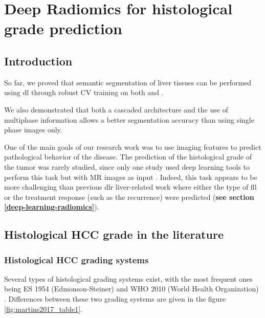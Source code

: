 

\chapter{Deep Radiomics for histological grade prediction}

\section{Introduction}\label{introduction}

So far, we proved that semantic segmentation of liver tissues can be
performed using \ac{dl} through robust CV training on both  and
.

We also demonstrated that both a cascaded architecture and the use of
multiphase information allows a better segmentation accuracy than using
single phase images only.

One of the main goals of our research work was to use imaging features
to predict pathological behavior of the disease. The prediction of the
histological grade of the tumor was rarely studied, since only one study
used deep learning tools to perform this task but with MR images as
input \cite{Yang2019}.
Indeed, this task appears to be more challenging than previous \ac{dlr}
liver-related work where either the type of \ac{fll} or the treatment
response (such as the recurrence) were predicted (\textbf{see section \ref{deep-learning-radiomics}}).

\section{Histological HCC grade in the literature
}\label{histological-hcc-grade-in-the-literature}

\subsection{Histological HCC grading
systems}\label{histological-hcc-grading-systems}

Several types of histological grading systems exist, with the most
frequent ones being ES 1954 (Edmonson-Steiner) \cite{EdmondsonHA1954}
and WHO 2010 (World Health Organization) \cite{20113051318}. Differences between these two
grading systems are given in the figure \ref{fig:martins2017_table1}.

